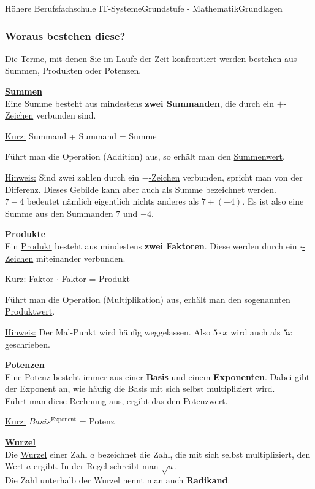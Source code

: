 \documentclass[11pt,twocolumn,oneside,openany,headings=optiontotoc,11pt,numbers=noenddot]{article}
\begin{document}
\begin{worksheet}{Höhere Berufsfachschule IT-Systeme}{Grundstufe - Mathematik}{Grundlagen}
		\subsubsection*{Woraus bestehen diese?}
		Die Terme, mit denen Sie im Laufe der Zeit konfrontiert werden bestehen aus Summen, Produkten oder Potenzen.\\
		\par\noindent
		\textbf{\underline{Summen}}\\
		Eine \underline{Summe} besteht aus mindestens \textbf{zwei Summanden}, die durch ein \underline{\(+\)-Zeichen} verbunden sind.
		\begin{framed}\noindent
			\underline{Kurz:} Summand + Summand = Summe
		\end{framed}
		\noindent
		Führt man die Operation (Addition) aus, so erhält man den \underline{Summenwert}.\\
		\par\noindent
		\underline{Hinweis:} Sind zwei zahlen durch ein \underline{\glqq{}\(-\)\grqq{}-Zeichen} verbunden, spricht man von der \underline{Differenz}. Dieses Gebilde kann aber auch als Summe bezeichnet werden.\\
		\(7-4\) bedeutet nämlich eigentlich nichts anderes als \(7 + (-4)\). Es ist also eine Summe aus den Summanden \(7\) und \(-4\).\\
		\par\noindent
		\textbf{\underline{Produkte}}\\
		Ein \underline{Produkt} besteht aus mindestens \textbf{zwei Faktoren}. Diese werden durch ein \underline{\glqq{}\(\cdot\)\grqq{}-Zeichen} miteinander verbunden.
		\begin{framed}
			\noindent
			\underline{Kurz:} Faktor $\cdot$ Faktor = Produkt
		\end{framed}
		\noindent
		Führt man die Operation (Multiplikation) aus, erhält man den sogenannten \underline{Produktwert}.\\
		\par\noindent
		\underline{Hinweis:} Der Mal-Punkt wird häufig weggelassen. Also \(5\cdot x\) wird auch als \(5x\) geschrieben.\\
		\par\noindent
		\textbf{\underline{Potenzen}}\\
		Eine \underline{Potenz} besteht immer aus einer \textbf{Basis} und einem \textbf{Exponenten}. Dabei gibt der Exponent an, wie häufig die Basis mit sich selbst multipliziert wird.\\
		Führt man diese Rechnung aus, ergibt das den \underline{Potenzwert}.
		\begin{framed}
			\noindent
			\underline{Kurz:} \(Basis^{\text{Exponent}}\) = Potenz
		\end{framed}
		\noindent
		\underline{\textbf{Wurzel}}\\
		Die \underline{Wurzel} einer Zahl \(a\) bezeichnet die Zahl, die mit sich selbst multipliziert, den Wert \(a\) ergibt. In der Regel schreibt man \(\sqrt{a}\).\\
		Die Zahl unterhalb der Wurzel nennt man auch \textbf{Radikand}.

\end{worksheet}
\end{document}
